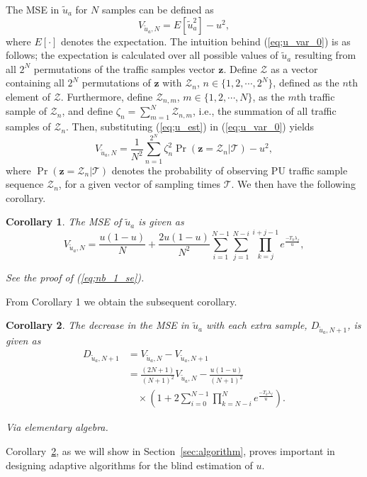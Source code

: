 \documentclass[11pt,draftclsnofoot,journal,onecolumn]{IEEEtran}
\newtheorem{corollary}{Corollary}
\begin{document}
The MSE in $\tilde{u}_a$ for $N$ samples can be defined as
\begin{equation}
V_{\tilde{u}_a,N} = E\left[\tilde{u}_a^2\right]-u^2,
\label{eq;u_var_0}
\end{equation}
where $E[\cdot]$ denotes the expectation. The intuition behind (\ref{eq;u_var_0}) is as follows; the expectation is calculated over all possible values of $\tilde{u}_a$ resulting from all $2^N$ permutations of the traffic samples vector $\boldsymbol{z}$. Define $\mathcal{Z}$ as a vector containing all $2^N$ permutations of $\boldsymbol{z}$ with $\mathcal{Z}_n$, $n \in \{1,2,\cdots,2^N\}$, defined as the $n$th element of $\mathcal{Z}$. Furthermore, define $\mathcal{Z}_{n,m}$, $m \in \{1,2,\cdots,N\}$, as the $m$th traffic sample of $\mathcal{Z}_n$, and define $\zeta_n = \sum_{m=1}^{N} \mathcal{Z}_{n,m}$, i.e., the summation of all traffic samples of $\mathcal{Z}_n$. Then, substituting (\ref{eq;u_est}) in (\ref{eq;u_var_0}) yields
\begin{equation}
V_{\tilde{u}_a,N} = \frac{1}{N^2}\sum_{n=1}^{2^N} \zeta_n^2 \Pr(\boldsymbol{z} = \mathcal{Z}_n|\mathcal{T})-u^2,
\label{eq;u_var_1}
\end{equation}
where $\Pr(\boldsymbol{z} = \mathcal{Z}_n|\mathcal{T})$ denotes the probability of observing PU traffic sample sequence $\mathcal{Z}_n$, for a given vector of sampling times $\mathcal{T}$. We then have the following corollary.
\begin{corollary}
The MSE of $\tilde{u}_a$ is given as
\begin{equation}
V_{\tilde{u}_a,N} = \frac{u(1-u)}{N} + \frac{2u(1-u)}{N^2} \sum_{i=1}^{N-1} \sum_{j=1}^{N-i} \prod_{k=j}^{i+j-1} e^{\frac{-T_{k}\lambda_f}{u}},
\label{eq;nb_1}
\end{equation}
\begin{IEEEproof}
See the proof of (\ref{eq;nb_1_se}).
\end{IEEEproof} 
\end{corollary}
From Corollary 1 we obtain the subsequent corollary.
\begin{corollary}
\label{cor_3}
The decrease in the MSE in $\tilde{u}_a$ with each extra sample, $D_{\tilde{u}_a,N+1}$, is given as
\begin{align}
D_{\tilde{u}_a,N+1} & = V_{\tilde{u}_a,N} - V_{\tilde{u}_a,N+1} \nonumber \\ &= \frac{(2N+1)}{(N+1)^2}V_{\tilde{u}_a,N} - \frac{u(1-u)}{(N+1)^2}\nonumber\\&\quad\times \left(1+2\sum_{i=0}^{N-1} \prod_{k=N-i}^{N} e^{\frac{-T_{k}\lambda_f}{u}} \right).
\label{eq;vu_nu_dec}
\end{align}
\begin{IEEEproof}
Via elementary algebra.
\end{IEEEproof} 
\end{corollary}
Corollary~\ref{cor_3}, as we will show in Section~\ref{sec:algorithm}, proves important in designing adaptive algorithms for the blind estimation of $u$.
\end{document}
